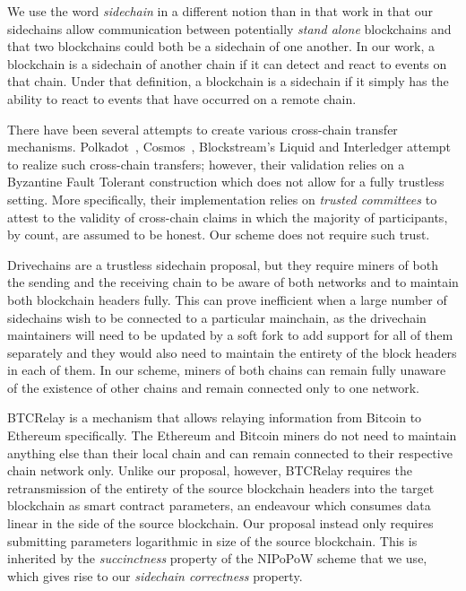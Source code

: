We use the word \emph{sidechain} in a different notion than in that work in that
our sidechains allow communication between potentially \emph{stand alone}
blockchains and that two blockchains could both be a sidechain of one another.
In our work, a blockchain is a sidechain of another chain if it can detect and
react to events on that chain. Under that definition, a blockchain is a
sidechain if it simply has the ability to react to events that have occurred on
a remote chain.

There have been several attempts to create various cross-chain transfer
mechanisms. Polkadot~\cite{wood2016polkadot},
Cosmos~\cite{buchman2016tendermint}, Blockstream's Liquid and Interledger
attempt to realize such cross-chain transfers; however, their validation relies
on a Byzantine Fault Tolerant construction which does not allow for a fully
trustless setting. More specifically, their implementation relies on
\emph{trusted committees} to attest to the validity of cross-chain claims in
which the majority of participants, by count, are assumed to be honest. Our
scheme does not require such trust.

Drivechains are a trustless sidechain proposal, but they require miners of both
the sending and the receiving chain to be aware of both networks and to maintain
both blockchain headers fully. This can prove inefficient when a large number of
sidechains wish to be connected to a particular mainchain, as the drivechain
maintainers will need to be updated by a soft fork to add support for all of
them separately and they would also need to maintain the entirety of the block
headers in each of them. In our scheme, miners of both chains can remain fully
unaware of the existence of other chains and remain connected only to one
network.

BTCRelay is a mechanism that allows relaying information from Bitcoin to
Ethereum specifically. The Ethereum and Bitcoin miners do not need to maintain
anything else than their local chain and can remain connected to their
respective chain network only. Unlike our proposal, however, BTCRelay requires
the retransmission of the entirety of the source blockchain headers into the
target blockchain as smart contract parameters, an endeavour which consumes data
linear in the side of the source blockchain. Our proposal instead only requires
submitting parameters logarithmic in size of the source blockchain. This is
inherited by the \emph{succinctness} property of the NIPoPoW scheme that we use,
which gives rise to our \emph{sidechain correctness} property.
